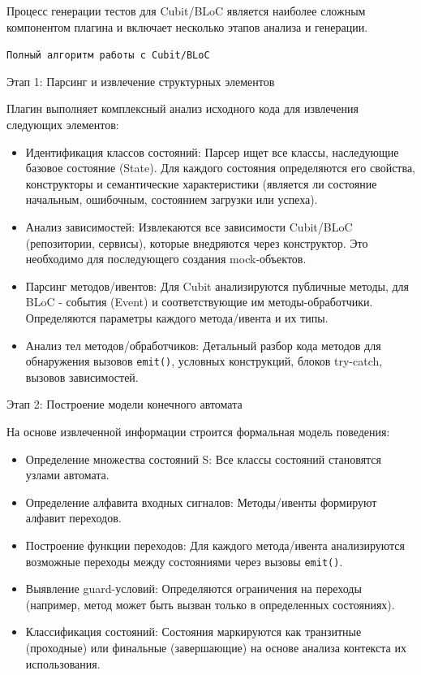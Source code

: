 \documentclass[14pt, russian]{scrartcl}
\begin{document}
Процесс генерации тестов для Cubit/BLoC является наиболее сложным компонентом плагина и включает несколько этапов анализа и генерации.

\texttt{Полный алгоритм работы с Cubit/BLoC}

Этап 1: Парсинг и извлечение структурных элементов

Плагин выполняет комплексный анализ исходного кода для извлечения следующих элементов:
\begin{itemize}
    \item Идентификация классов состояний: Парсер ищет все классы, наследующие базовое состояние (State). Для каждого состояния определяются его свойства, конструкторы и семантические характеристики (является ли состояние начальным, ошибочным, состоянием загрузки или успеха).
    \item Анализ зависимостей: Извлекаются все зависимости Cubit/BLoC (репозитории, сервисы), которые внедряются через конструктор. Это необходимо для последующего создания mock-объектов.
    \item Парсинг методов/ивентов: Для Cubit анализируются публичные методы, для BLoC - события (Event) и соответствующие им методы-обработчики. Определяются параметры каждого метода/ивента и их типы.
    \item Анализ тел методов/обработчиков: Детальный разбор кода методов для обнаружения вызовов \texttt{emit()}, условных конструкций, блоков try-catch, вызовов зависимостей.
\end{itemize}

Этап 2: Построение модели конечного автомата

На основе извлеченной информации строится формальная модель поведения:
\begin{itemize}
    \item Определение множества состояний S: Все классы состояний становятся узлами автомата.
    \item Определение алфавита входных сигналов: Методы/ивенты формируют алфавит переходов.
    \item Построение функции переходов: Для каждого метода/ивента анализируются возможные переходы между состояниями через вызовы \texttt{emit()}.
    \item Выявление guard-условий: Определяются ограничения на переходы (например, метод может быть вызван только в определенных состояниях).
    \item Классификация состояний: Состояния маркируются как транзитные (проходные) или финальные (завершающие) на основе анализа контекста их использования.
\end{itemize}
\end{document}
